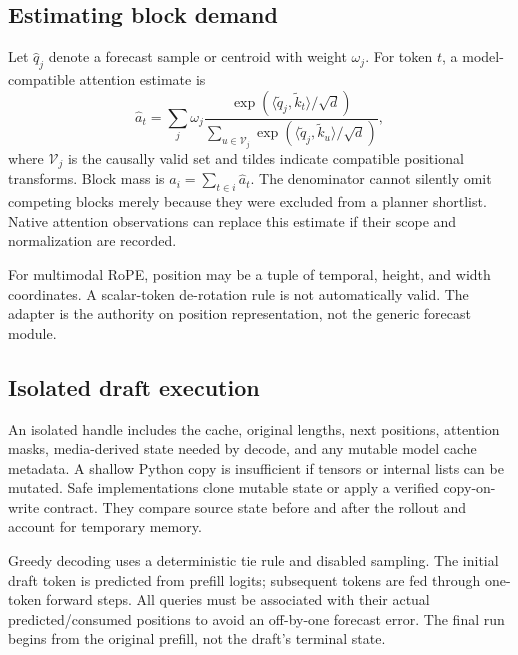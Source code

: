 \subsection{Estimating block demand}
Let $\widehat q_j$ denote a forecast sample or centroid with weight $\omega_j$.
For token $t$, a model-compatible attention estimate is
\begin{equation}
 \widehat a_t=\sum_j\omega_j
 \frac{\exp(\langle\widetilde q_j,\widetilde k_t\rangle/\sqrt d)}
 {\sum_{u\in\mathcal V_j}\exp(\langle\widetilde q_j,\widetilde k_u\rangle/\sqrt d)},
\end{equation}
where $\mathcal V_j$ is the causally valid set and tildes indicate compatible
positional transforms. Block mass is $a_i=\sum_{t\in i}\widehat a_t$.
The denominator cannot silently omit competing blocks merely because they
were excluded from a planner shortlist. Native attention observations can
replace this estimate if their scope and normalization are recorded.

For multimodal RoPE, position may be a tuple of temporal, height, and width
coordinates. A scalar-token de-rotation rule is not automatically valid.
The adapter is the authority on position representation, not the generic
forecast module.

\subsection{Isolated draft execution}
An isolated handle includes the cache, original lengths, next positions,
attention masks, media-derived state needed by decode, and any mutable model
cache metadata. A shallow Python copy is insufficient if tensors or internal
lists can be mutated. Safe implementations clone mutable state or apply a
verified copy-on-write contract. They compare source state before and after
the rollout and account for temporary memory.

Greedy decoding uses a deterministic tie rule and disabled sampling. The
initial draft token is predicted from prefill logits; subsequent tokens are
fed through one-token forward steps. All queries must be associated with their
actual predicted/consumed positions to avoid an off-by-one forecast error.
The final run begins from the original prefill, not the draft's terminal state.

